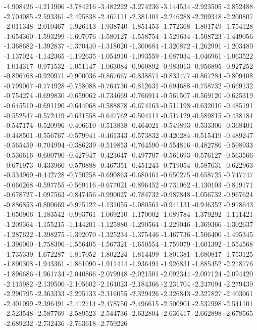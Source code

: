 -4.908426
-4.211906
-3.784216
-3.482222
-3.274236
-3.144534
-2.923505
-2.852488
-2.704085
-2.593361
-2.495838
-2.467111
-2.381401
-2.246288
-2.209348
-2.200807
-2.011348
-2.010467
-1.926113
-1.938740
-1.851453
-1.772368
-1.801749
-1.754128
-1.654360
-1.593299
-1.607076
-1.580127
-1.558754
-1.529634
-1.508723
-1.449056
-1.368682
-1.392837
-1.370440
-1.318020
-1.300684
-1.320872
-1.262991
-1.203489
-1.137024
-1.142365
-1.192635
-1.054910
-1.093559
-1.087034
-1.046961
-1.063522
-1.014317
-0.971532
-1.051147
-1.063084
-0.960892
-0.983013
-0.956895
-0.927252
-0.896768
-0.920971
-0.900036
-0.867667
-0.838871
-0.833477
-0.867284
-0.809408
-0.799067
-0.774928
-0.758088
-0.764730
-0.812631
-0.694688
-0.758732
-0.669132
-0.754274
-0.699830
-0.659062
-0.734669
-0.766914
-0.561507
-0.569120
-0.625319
-0.645510
-0.691190
-0.644068
-0.588878
-0.674163
-0.511198
-0.632010
-0.485191
-0.552547
-0.572449
-0.631558
-0.647762
-0.504111
-0.517129
-0.589815
-0.438184
-0.547174
-0.520996
-0.406610
-0.513838
-0.464021
-0.549893
-0.533306
-0.368401
-0.448501
-0.556767
-0.579941
-0.461343
-0.573832
-0.420284
-0.515419
-0.489247
-0.565459
-0.704994
-0.386239
-0.519853
-0.764590
-0.554816
-0.482786
-0.598933
-0.536616
-0.600790
-0.427947
-0.423647
-0.497707
-0.561693
-0.576127
-0.563566
-0.671973
-0.433960
-0.570888
-0.467351
-0.451243
-0.719054
-0.587631
-0.622963
-0.534969
-0.442728
-0.750258
-0.690863
-0.680461
-0.650275
-0.658725
-0.747747
-0.666268
-0.597755
-0.569116
-0.677021
-0.896452
-0.731062
-1.130103
-0.819171
-0.678727
-1.097563
-0.847456
-0.990027
-0.784732
-0.987848
-1.056732
-0.967624
-0.886853
-0.800669
-0.975122
-1.131055
-1.080561
-0.941131
-0.946352
-0.918643
-1.050906
-1.183542
-0.993761
-1.069210
-1.170002
-1.089784
-1.379292
-1.111421
-1.209364
-1.155215
-1.144201
-1.125880
-1.290564
-1.229046
-1.369366
-1.302637
-1.287622
-1.398275
-1.392070
-1.325234
-1.375446
-1.467736
-1.506400
-1.495345
-1.396060
-1.758390
-1.556405
-1.567321
-1.650554
-1.759079
-1.601392
-1.554568
-1.735339
-1.672287
-1.817052
-1.802224
-1.814499
-1.801381
-1.680817
-1.753125
-1.890308
-1.943361
-1.861090
-1.911414
-1.936491
-1.926831
-1.885452
-2.218776
-1.896686
-1.961734
-2.040866
-2.079948
-2.021501
-2.092344
-2.097124
-2.094420
-2.115982
-2.139500
-2.105602
-2.164023
-2.184366
-2.231704
-2.247094
-2.279439
-2.290795
-2.363333
-2.295133
-2.316055
-2.329426
-2.326843
-2.327827
-2.403061
-2.401099
-2.396491
-2.412714
-2.478750
-2.496615
-2.500901
-2.537998
-2.541101
-2.523548
-2.587769
-2.589523
-2.544736
-2.632804
-2.636417
-2.662898
-2.678565
-2.689232
-2.732436
-2.763618
-2.759226
